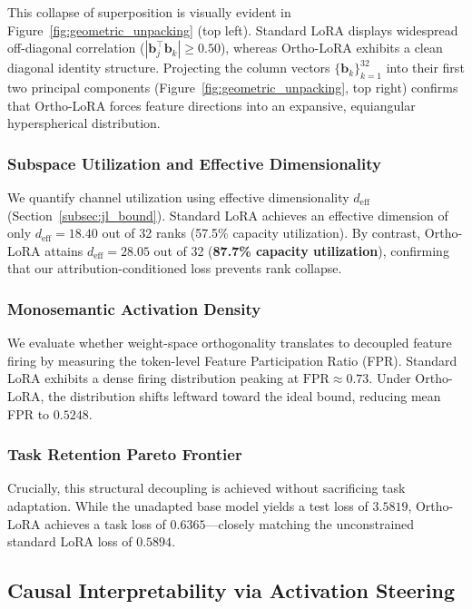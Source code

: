 \documentclass[10pt,twocolumn,letterpaper]{article}
\begin{document}
This collapse of superposition is visually evident in Figure~\ref{fig:geometric_unpacking} (top left). Standard LoRA displays widespread off-diagonal correlation ($|\bm{b}_j^\top \bm{b}_k| \ge 0.50$), whereas Ortho-LoRA exhibits a clean diagonal identity structure. Projecting the column vectors $\{\bm{b}_k\}_{k=1}^{32}$ into their first two principal components (Figure~\ref{fig:geometric_unpacking}, top right) confirms that Ortho-LoRA forces feature directions into an expansive, equiangular hyperspherical distribution.

\subsubsection{Subspace Utilization and Effective Dimensionality}
We quantify channel utilization using effective dimensionality $d_{\text{eff}}$ (Section~\ref{subsec:jl_bound}). Standard LoRA achieves an effective dimension of only $d_{\text{eff}} = 18.40$ out of 32 ranks (57.5\% capacity utilization). By contrast, Ortho-LoRA attains $d_{\text{eff}} = 28.05$ out of 32 (\textbf{87.7\% capacity utilization}), confirming that our attribution-conditioned loss prevents rank collapse.

\subsubsection{Monosemantic Activation Density}
We evaluate whether weight-space orthogonality translates to decoupled feature firing by measuring the token-level Feature Participation Ratio (FPR). Standard LoRA exhibits a dense firing distribution peaking at $\text{FPR} \approx 0.73$. Under Ortho-LoRA, the distribution shifts leftward toward the ideal bound, reducing mean FPR to $0.5248$.

\subsubsection{Task Retention Pareto Frontier}
Crucially, this structural decoupling is achieved without sacrificing task adaptation. While the unadapted base model yields a test loss of $3.5819$, Ortho-LoRA achieves a task loss of $0.6365$---closely matching the unconstrained standard LoRA loss of $0.5894$.

\subsection{Causal Interpretability via Activation Steering}
\label{subsec:res_steering}
\end{document}

